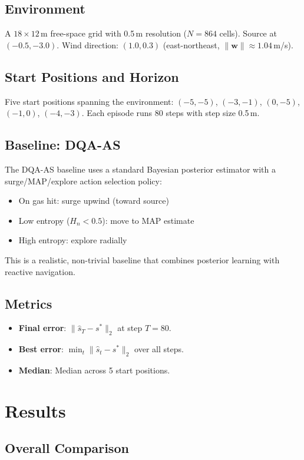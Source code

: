 \documentclass[conference]{IEEEtran}
\begin{document}
\subsection{Environment}
A $18 \times 12$\,m free-space grid with 0.5\,m resolution ($N = 864$ cells).
Source at $(-0.5, -3.0)$.
Wind direction: $(1.0, 0.3)$ (east-northeast, $\|\mathbf{w}\| \approx 1.04$\,m/s).

\subsection{Start Positions and Horizon}
Five start positions spanning the environment: $(-5,-5)$, $(-3,-1)$, $(0,-5)$, $(-1,0)$, $(-4,-3)$.
Each episode runs 80 steps with step size 0.5\,m.

\subsection{Baseline: DQA-AS}
The DQA-AS baseline uses a standard Bayesian posterior estimator with a surge/MAP/explore action selection policy:
\begin{itemize}
    \item On gas hit: surge upwind (toward source)
    \item Low entropy ($H_n < 0.5$): move to MAP estimate
    \item High entropy: explore radially
\end{itemize}
This is a realistic, non-trivial baseline that combines posterior learning with reactive navigation.

\subsection{Metrics}
\begin{itemize}
    \item \textbf{Final error}: $\|\hat{s}_T - s^*\|_2$ at step $T = 80$.
    \item \textbf{Best error}: $\min_t \|\hat{s}_t - s^*\|_2$ over all steps.
    \item \textbf{Median}: Median across 5 start positions.
\end{itemize}

\section{Results}

\subsection{Overall Comparison}
\end{document}
